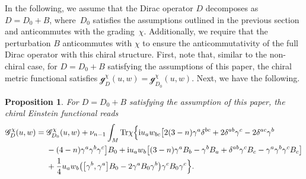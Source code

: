 \documentclass[pdftex]{sigma}
\numberwithin{equation}{section}
\newtheorem{Proposition}[Theorem]{Proposition}
\theoremstyle{definition}
\def\Tr{\mathrm{Tr}}
\begin{document}
In the following, we assume that the Dirac operator $D$ decomposes as $D=D_0+B$, where~$D_0$ satisfies the assumptions outlined in the previous section and anticommutes with the grading~$\chi$. Additionally, we require that the perturbation $B$ anticommutes with $\chi$ to ensure the anticommutativity of the full Dirac operator with this chiral structure. First, note that, similar to the non-chiral case, for $D=D_0+B$ satisfying the assumptions of this paper, the chiral metric functional satisfies $\mathscr{g}^\chi_D(u,w) = \mathscr{g}^\chi_{D_0}(u,w)$. Next, we have the following.

\begin{Proposition}
	\label{prop:Einchi}
	For $D = D_0+B$ satisfying the assumption of this paper, the chiral Einstein functional reads
		\begin{align*}
			\mathscr{G}_D^\chi(u,w)={}& \mathscr{G}_{D_0}^\chi(u,w)
 + \nu_{n-1}\int_M\Tr \chi\Bigr\{
 {\rm i}u_a w_{bc}\bigl[2(3-n)\gamma^a \delta^{bc}+2\delta^{ab} \gamma^c -2\delta^{ac} \gamma^b \\
 &-(4-n)\gamma^a\gamma^b\gamma^c\bigr]B_0+{\rm i}u_a w_b \bigl[(3-n)\gamma^a B_b -\gamma^b B_a +\delta^{ab}\gamma^c B_c - \gamma^a\gamma^b\gamma^c B_c\bigr]\\
 & +\frac{1}{4}u_aw_b \bigl(\bigl[\gamma^b,\gamma^a\bigr] B_0 -2\gamma^a B_0 \gamma^b\bigr)\gamma^c B_0 \gamma^c
 \Bigr\}.
		\end{align*}
\end{Proposition}
\end{document}
